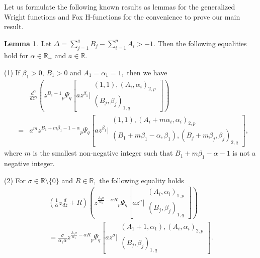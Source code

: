 \documentclass[12pt]{article}
\theoremstyle{definition}
\newtheorem{lemma}{Lemma}
\begin{document}
Let us formulate  the  following  known  results as lemmas for  the  generalized  Wright  functions \cite{kilb2005,Kiryakova, Khon} and Fox H-functions \cite{Hnom2, glock, Khon} for the convenience to prove our main result.
\begin{lemma}\label{le3} 
Let $\Delta=\sum\limits_{j=1}^q B_j-\sum\limits_{i=1}^p A_i>-1.$ Then the following equalities hold for $\alpha \in\mathbb{R}_+$ and $a\in\mathbb{R}.$

(1) If $\beta_1>0$, $B_1>0$ and $A_1=\alpha_1=1,$ then  we have
\begin{eqnarray*}
 & & \frac{d^\alpha}{d z^\alpha}\left(z^{B_1-1}{}_p\Psi_q\left[a z^{\beta_1}\biggr\vert\begin{array}{c}
(1,1), (A_i,\alpha_i)_{2,p}\\
(B_j,\beta_j)_{1,q}
\end{array}\right]\right)\\
& = & a^m z^{B_1+m\beta_1-1-\alpha}{}_{p}\Psi_{q}\left[az^{\beta_1}\biggr\vert\begin{array}{c}
(1,1), (A_i+m\alpha_i,\alpha_i)_{2,p}\\
(B_1+m\beta_1-\alpha,\beta_1), (B_j+m\beta_j,\beta_j)_{2,q}
\end{array}\right],
\end{eqnarray*}
where $m$ is the smallest non-negative integer such that $B_1+m\beta_1 -\alpha-1$ is not a negative integer.

(2) For $\sigma\in\mathbb{R}\setminus\{0\}$ and $R\in\mathbb{R},$ the following equality holds
\begin{multline*}
\left(\frac{1}{\alpha}z\frac{d}{d z}+R\right)\left(z^{\frac{A_1\sigma}{\alpha_1}-\alpha R}{}_p\Psi_q\left[az^{\sigma}\biggr\vert\begin{array}{c}
(A_i,\alpha_i)_{1,p}\\
(B_j,\beta_j)_{1,q}
\end{array}\right]\right)
\\=
\frac{\sigma}{\alpha_1\alpha} z^{\frac{A_1\sigma}{\alpha_1}-\alpha R}{}_p\Psi_q\left[az^{\sigma}\biggr\vert\begin{array}{c}
(A_1+1,\alpha_1), (A_i,\alpha_i)_{2,p}\\
(B_j,\beta_j)_{1,q}
\end{array}\right].
\end{multline*}
\end{lemma}
\end{document}

